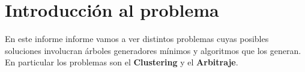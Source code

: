 \documentclass[11pt,a4paper]{article}
\begin{document}

\fecha{\today}




\maketitle

\newpage
%

\section{Introducción al problema}
En este informe informe vamos a ver distintos problemas cuyas posibles soluciones involucran árboles generadores mínimos y algoritmos que los generan. En particular los problemas son el \textbf{Clustering} y el \textbf{Arbitraje}.
\end{document}
